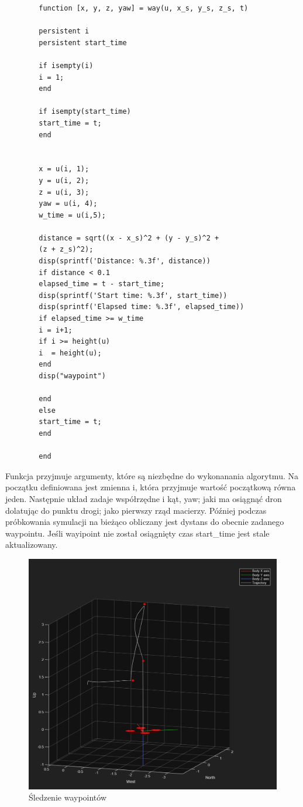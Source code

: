 \documentclass[polish,11pt,a4paper]{article}
\begin{document}
\begin{footnotesize}
	\begin{verbatim}
		function [x, y, z, yaw] = way(u, x_s, y_s, z_s, t)
		
		persistent i
		persistent start_time
		
		if isempty(i)
		i = 1;
		end
		
		if isempty(start_time)
		start_time = t;
		end
		
		
		x = u(i, 1);
		y = u(i, 2);
		z = u(i, 3);
		yaw = u(i, 4);
		w_time = u(i,5);
		
		distance = sqrt((x - x_s)^2 + (y - y_s)^2 + 
		(z + z_s)^2);
		disp(sprintf('Distance: %.3f', distance))
		if distance < 0.1
		elapsed_time = t - start_time;
		disp(sprintf('Start time: %.3f', start_time))
		disp(sprintf('Elapsed time: %.3f', elapsed_time))
		if elapsed_time >= w_time
		i = i+1;
		if i >= height(u)
		i  = height(u);
		end
		disp("waypoint")
		
		end
		else
		start_time = t;
		end
		
		end
	\end{verbatim}
\end{footnotesize}


Funkcja przyjmuje argumenty, które są niezbędne do wykonanania algorytmu. Na początku definiowana jest
zmienna i, która przyjmuje wartość początkową równa jeden. Następnie układ zadaje współrzędne i kąt, yaw; jaki
ma osiągnąć dron dolatując do punktu drogi; jako pierwszy rząd macierzy. Później podczas próbkowania symulacji
na bieżąco obliczany jest dystans do obecnie zadanego waypointu. Jeśli wayipoint nie został osiągnięty
czas start\_time jest stale aktualizowany. 

\begin{figure}[H]
	\centering
	\includegraphics[width=\linewidth]{nakazane/nakaz.png}
	\caption{Śledzenie waypointów}
\end{figure}
\end{document}
